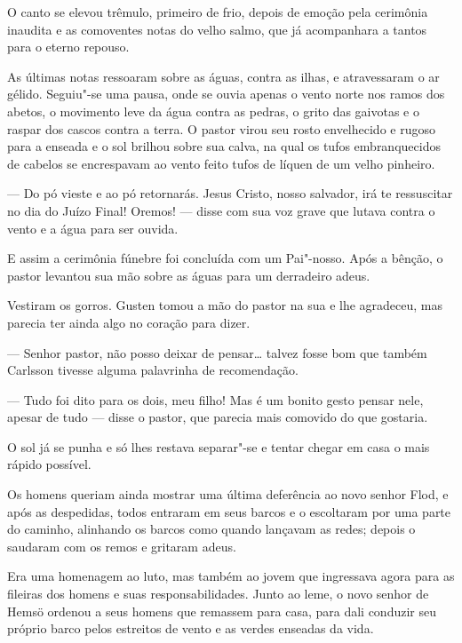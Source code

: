 O canto se elevou trêmulo, primeiro de frio, depois de emoção pela cerimônia
inaudita e as comoventes notas do velho salmo, que já acompanhara a tantos para
o eterno repouso.

As últimas notas ressoaram sobre as águas, contra as ilhas, e atravessaram o ar gélido. 
Seguiu"-se uma pausa, onde se ouvia apenas o vento norte nos ramos dos
abetos, o  movimento leve da água contra as pedras, o grito das gaivotas e o raspar
dos cascos contra a terra. O pastor virou seu rosto envelhecido e
rugoso para a enseada e o sol brilhou sobre sua calva, na qual os
tufos embranquecidos de cabelos se encrespavam ao vento feito tufos de líquen
de um velho pinheiro.

--- Do pó vieste e ao pó retornarás. Jesus Cristo, nosso salvador, irá te
ressuscitar no dia do Juízo Final! Oremos! --- disse com sua voz grave que lutava
contra o vento e a água para ser ouvida.

E assim a cerimônia fúnebre foi concluída com um Pai"-nosso. Após a bênção, o
pastor levantou sua mão sobre as águas para um derradeiro adeus.

Vestiram os gorros. Gusten tomou a mão do pastor na sua e lhe agradeceu, mas
parecia ter ainda algo no coração para dizer.

--- Senhor pastor, não posso deixar de pensar\ldots{} talvez fosse bom que também
Carlsson tivesse alguma palavrinha de recomendação.

--- Tudo foi dito para os dois, meu filho! Mas é um bonito gesto pensar nele,
apesar de tudo --- disse o pastor, que parecia mais comovido do que gostaria.

O sol já se punha e só lhes restava separar"-se e tentar chegar em casa o mais
rápido possível.

Os homens queriam ainda mostrar uma última deferência ao novo senhor Flod, e
após as despedidas, todos entraram em seus barcos e o escoltaram por uma
parte do caminho, alinhando os barcos como quando lançavam as redes;
depois o saudaram com os remos e gritaram adeus.

Era uma homenagem ao luto, mas também ao jovem que ingressava agora para as
fileiras dos homens e suas responsabilidades. Junto ao leme, o novo senhor de
Hemsö ordenou a seus homens que remassem para casa, para dali conduzir seu próprio
barco pelos estreitos de vento e as verdes enseadas da vida.


